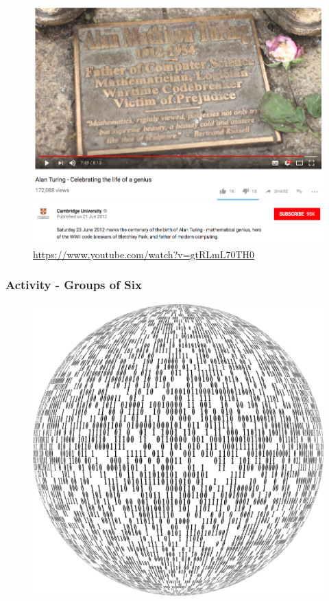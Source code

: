 \begin{frame}
	\begin{figure}
		\includegraphics[scale=0.2]{assets/turingvideo.png}
		\caption{\href{https://www.youtube.com/watch?v=gtRLmL70TH0}{https://www.youtube.com/watch?v=gtRLmL70TH0}}
	\end{figure}
\end{frame}

\begin{frame}
	\frametitle{Activity - Groups of Six}
	\begin{figure}
		\includegraphics[scale=0.3]{assets/activity.png}
	\end{figure}
\end{frame}


